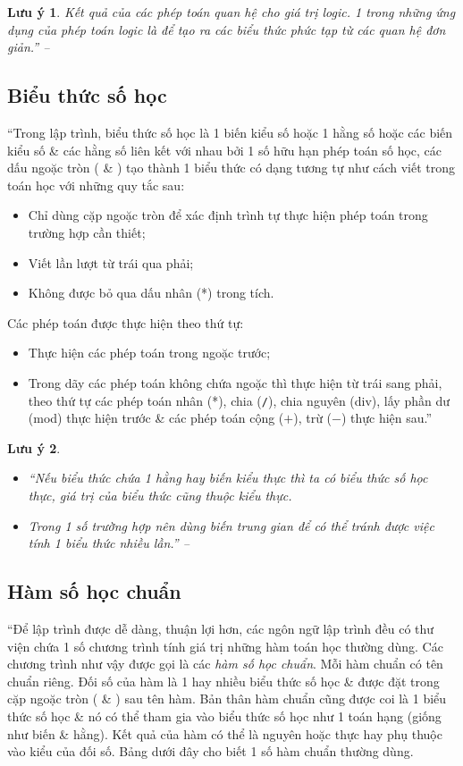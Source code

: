 \documentclass[oneside]{book}
\numberwithin{equation}{section}
\newtheorem{luuy}{Lưu ý}[section]
\begin{document}
\begin{luuy}
	Kết quả của các phép toán quan hệ cho giá trị logic. 1 trong những ứng dụng của phép toán logic là để tạo ra các biểu thức phức tạp từ các quan hệ đơn giản.'' -- \cite[p. 24]{SGK_Tin_Hoc_11}
\end{luuy}

\subsection{Biểu thức số học}
``Trong lập trình, biểu thức số học là 1 biến kiểu số hoặc 1 hằng số hoặc các biến kiểu số \& các hằng số liên kết với nhau bởi 1 số hữu hạn phép toán số học, các dấu ngoặc tròn ( \& ) tạo thành 1 biểu thức có dạng tương tự như cách viết trong toán học với những quy tắc sau:
\begin{itemize}
	\item Chỉ dùng cặp ngoặc tròn để xác định trình tự thực hiện phép toán trong trường hợp cần thiết;
	\item Viết lần lượt từ trái qua phải;
	\item Không được bỏ qua dấu nhân (*) trong tích.
\end{itemize}
Các phép toán được thực hiện theo thứ tự:
\begin{itemize}
	\item Thực hiện các phép toán trong ngoặc trước;
	\item Trong dãy các phép toán không chứa ngoặc thì thực hiện từ trái sang phải, theo thứ tự các phép toán nhân (*), chia (\texttt{/}), chia nguyên (div), lấy phần dư (mod) thực hiện trước \& các phép toán cộng ($+$), trừ ($-$) thực hiện sau.''
\end{itemize}

\begin{luuy}
	\begin{itemize}
		\item ``Nếu biểu thức chứa 1 hằng hay biến kiểu thực thì ta có biểu thức số học thực, giá trị của biểu thức cũng thuộc kiểu thực.
		\item Trong 1 số trường hợp nên dùng biến trung gian để có thể tránh được việc tính 1 biểu thức nhiều lần.'' -- \cite[p. 25]{SGK_Tin_Hoc_11}
	\end{itemize}
\end{luuy}

\subsection{Hàm số học chuẩn}
``Để lập trình được dễ dàng, thuận lợi hơn, các ngôn ngữ lập trình đều có thư viện chứa 1 số chương trình tính giá trị những hàm toán học thường dùng. Các chương trình như vậy được gọi là các \textit{hàm số học chuẩn}. Mỗi hàm chuẩn có tên chuẩn riêng. Đối số của hàm là 1 hay nhiều biểu thức số học \& được đặt trong cặp ngoặc tròn ( \& ) sau tên hàm. Bản thân hàm chuẩn cũng được coi là 1 biểu thức số học \& nó có thể tham gia vào biểu thức số học như 1 toán hạng (giống như biến \& hằng). Kết quả của hàm có thể là nguyên hoặc thực hay phụ thuộc vào kiểu của đối số. Bảng dưới đây cho biết 1 số hàm chuẩn thường dùng.
\end{document}

